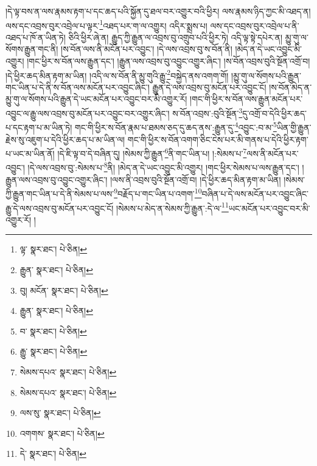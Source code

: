 །དེ་ལྟ་བས་ན་ལས་རྣམས་རྟག་པ་དང་ཆད་པའི་སྐྱོན་དུ་ཐལ་བར་འགྱུར་བའི་ཕྱིར། ལས་རྣམས་ཉིད་ཀྱང་མི་འཐད་ན། ལས་དང་འབྲས་བུར་འབྲེལ་པ་ལྟར་\footnote{ལྟ་  སྣར་ཐང་།  པེ་ཅིན། }འཐད་པར་ག་ལ་འགྱུར། འདིར་སྨྲས་པ། ལས་དང་འབྲས་བུར་འབྲེལ་པ་ནི་འཐད་པ་ཁོ་ན་ཡིན་ཏེ། ཅིའི་ཕྱིར་ཞེ་ན། རྒྱུད་ཀྱི་རྒྱུན་ལ་འབྲས་བུ་འགྲུབ་པའི་ཕྱིར་ཏེ། འདི་ལྟ་སྟེ་དཔེར་ན། མྱུ་གུ་ལ་སོགས་རྒྱུན་གང་ནི། །ས་བོན་ལས་ནི་མངོན་པར་འབྱུང་། །དེ་ལས་འབྲས་བུ་ས་བོན་ནི། །མེད་ན་དེ་ཡང་འབྱུང་མི་འགྱུར། །གང་ཕྱིར་ས་བོན་ལས་རྒྱུན་དང་། །རྒྱུན་ལས་འབྲས་བུ་འབྱུང་འགྱུར་ཞིང་། །ས་བོན་འབྲས་བུའི་སྔོན་འགྲོ་བ། །དེ་ཕྱིར་ཆད་མིན་རྟག་མ་ཡིན། །འདི་ལ་ས་བོན་ནི་མྱུ་གུའི་རྒྱུ་\footnote{རྒྱུན་  སྣར་ཐང་།  པེ་ཅིན། }བསྐྱེད་ནས་འགག་གོ། །མྱུ་གུ་ལ་སོགས་པའི་རྒྱུན་གང་ཡིན་པ་དེ་ནི་ས་བོན་ལས་མངོན་པར་འབྱུང་ཞིང་། རྒྱུན་དེ་ལས་འབྲས་བུ་མངོན་པར་འབྱུང་ངོ། །ས་བོན་མེད་ན་མྱུ་གུ་ལ་སོགས་པའི་རྒྱུན་དེ་ཡང་མངོན་པར་འབྱུང་བར་མི་འགྱུར་རོ། །གང་གི་ཕྱིར་ས་བོན་ལས་རྒྱུན་མངོན་པར་འབྱུང་ལ་རྒྱུ་ལས་འབྲས་བུ་མངོན་པར་འབྱུང་བར་འགྱུར་ཞིང་། ས་བོན་འབྲས་:བུའི་སྔོན་\footnote{བུ། མངོན་  སྣར་ཐང་།  པེ་ཅིན། }དུ་འགྲོ་བ་དེའི་ཕྱིར་ཆད་པ་དང་རྟག་པ་མ་ཡིན་ཏེ། གང་གི་ཕྱིར་ས་བོན་རྣམ་པ་ཐམས་ཅད་དུ་ཆད་ནས་:རྒྱུན་དུ་\footnote{རྒྱུན་  སྣར་ཐང་།  པེ་ཅིན། }འབྱུང་:བ་མ་\footnote{བ་  སྣར་ཐང་།  པེ་ཅིན། }ཡིན་གྱི་རྒྱུན་རྗེས་སུ་འཇུག་པ་དེའི་ཕྱིར་ཆད་པ་མ་ཡིན་ལ། གང་གི་ཕྱིར་ས་བོན་འགག་ཅིང་ངེས་པར་མི་གནས་པ་དེའི་ཕྱིར་རྟག་པ་ཡང་མ་ཡིན་ནོ། །དེ་ཇི་ལྟ་བ་དེ་བཞིན་དུ། །སེམས་ཀྱི་རྒྱུན་\footnote{རྒྱུ་  སྣར་ཐང་།  པེ་ཅིན། }ནི་གང་ཡིན་པ། །:སེམས་པ་\footnote{སེམས་དཔའ་  སྣར་ཐང་།  པེ་ཅིན། }ལས་ནི་མངོན་པར་འབྱུང་། །དེ་ལས་འབྲས་བུ་:སེམས་པ་\footnote{སེམས་དཔའ་  སྣར་ཐང་།  པེ་ཅིན། }ནི། །མེད་ན་དེ་ཡང་འབྱུང་མི་འགྱུར། །གང་ཕྱིར་སེམས་པ་ལས་རྒྱུན་དང་། །རྒྱུན་ལས་འབྲས་བུ་འབྱུང་འགྱུར་ཞིང་། །ལས་ནི་འབྲས་བུའི་སྔོན་འགྲོ་བ། །དེ་ཕྱིར་ཆད་མིན་རྟག་མ་ཡིན། །སེམས་ཀྱི་རྒྱུན་གང་ཡིན་པ་དེ་ནི་སེམས་པ་ལས་\footnote{ལས་སུ་  སྣར་ཐང་།  པེ་ཅིན། }བརྗོད་པ་གང་ཡིན་པ་འགག་\footnote{འགགས་  སྣར་ཐང་།  པེ་ཅིན། }བཞིན་པ་དེ་ལས་མངོན་པར་འབྱུང་ཞིང་རྒྱུ་དེ་ལས་འབྲས་བུ་མངོན་པར་འབྱུང་ངོ། །སེམས་པ་མེད་ན་སེམས་ཀྱི་རྒྱུན་:དེ་ལ་\footnote{དེ་  སྣར་ཐང་།  པེ་ཅིན། }ཡང་མངོན་པར་འབྱུང་བར་མི་འགྱུར་རོ། །
